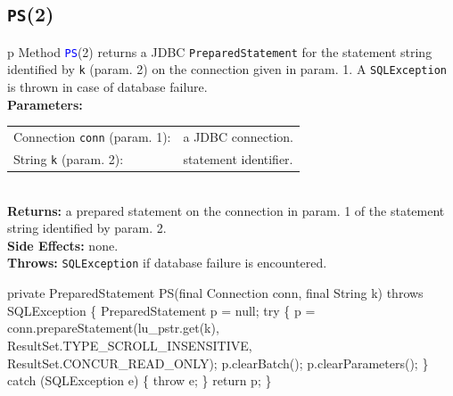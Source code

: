 \documentclass{article}
\def\nwendcode{\endtrivlist \endgroup}      %
\let\nwdocspar=\par
\theoremstyle{definition}                   %
\begin{document}
\subsection{{\tt{}\protect{}PS}(2)}
\begin{tabular}{p{\textwidth}}
\toprule
{}
Method \textcolor{blue}{{\tt{}\protect{}PS}}(2) returns a JDBC {\tt{}PreparedStatement} for the
statement string identified by {\tt{}k} (param. 2) on the connection given in
param. 1.  A {\tt{}SQLException} is thrown in case of database failure.\\
\midrule
\textbf{Parameters:} \\
\begin{tabular}{lp{116mm}}
Connection {\tt{}conn} (param. 1):&a JDBC connection.\\
String {\tt{}k} (param. 2):&statement identifier.\\
\end{tabular}\\
\textbf{Returns:} a prepared statement on the connection in param. 1 of the
statement string identified by param. 2.\\
\textbf{Side Effects:} none.\\
\textbf{Throws:} {\tt{}SQLException} if database failure is encountered.\\
\bottomrule
\end{tabular}
\nwenddocs{}\endmoddef{}
private PreparedStatement PS(final Connection conn, final String k) throws SQLException \{
  PreparedStatement p = null;
  try \{
    p = conn.prepareStatement(lu_pstr.get(k),
      ResultSet.TYPE_SCROLL_INSENSITIVE, ResultSet.CONCUR_READ_ONLY);
    p.clearBatch();
    p.clearParameters();
  \} catch (SQLException e) \{
    throw e;
  \}
  return p;
\}
\eatline
{}\nwendcode{}\nwdocspar
\end{document}
